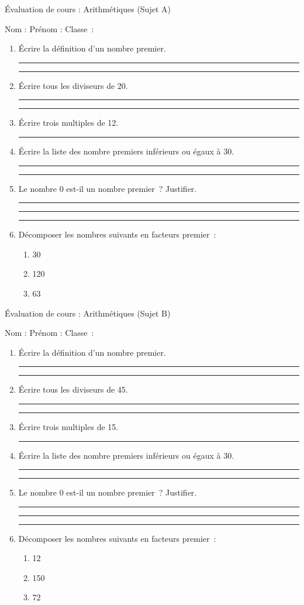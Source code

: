 \documentclass{article}
\def\trait{\vskip15pt\rule{\linewidth}{0.5pt}}
\begin{document}
\begin{center}
    \Large Évaluation de cours : Arithmétiques (Sujet A)
\end{center}
\vskip10pt
Nom : \hskip50pt Prénom : \hskip50pt Classe~:
\vskip20pt
\begin{enumerate}[label=\arabic*), font=\bfseries]
    \item Écrire la définition d'un nombre premier.
    \trait\trait
    \item Écrire tous les diviseurs de 20.
    \trait\trait
    \item Écrire trois multiples de 12.
    \trait
    \item Écrire la liste des nombre premiers inférieurs ou égaux à 30.
    \trait
    \trait
    \item Le nombre 0 est-il un nombre premier~? Justifier.
    \trait\trait\trait
    \item Décomposer les nombres suivants en facteurs premier~:
    \begin{enumerate}[label=\alph*), font=\bfseries]
        \item 30\vskip70pt
        \item 120\vskip70pt
        \item 63
    \end{enumerate}
\end{enumerate}
\newpage
\begin{center}
    \Large Évaluation de cours : Arithmétiques (Sujet B)
\end{center}
\vskip10pt
Nom : \hskip50pt Prénom : \hskip50pt Classe~:
\vskip20pt
\begin{enumerate}[label=\arabic*), font=\bfseries]
    \item Écrire la définition d'un nombre premier.
    \trait\trait
    \item Écrire tous les diviseurs de 45.
    \trait\trait
    \item Écrire trois multiples de 15.
    \trait
    \item Écrire la liste des nombre premiers inférieurs ou égaux à 30.
    \trait
    \trait
    \item Le nombre 0 est-il un nombre premier~? Justifier.
    \trait\trait\trait
    \item Décomposer les nombres suivants en facteurs premier~:
    \begin{enumerate}[label=\alph*), font=\bfseries]
        \item 12\vskip70pt
        \item 150\vskip70pt
        \item 72
    \end{enumerate}
\end{enumerate}
\end{document}
